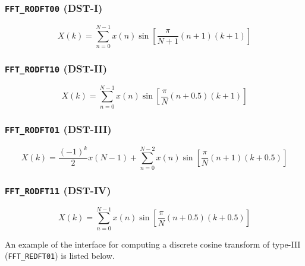 \subsubsection{{\tt FFT\_RODFT00} (DST-I)}
\label{module:fft:r2r:RODFT00}
    \begin{equation}
    \label{eqn:fft:dst-I}
        X(k) =  \sum_{n=0}^{N-1}{
                    x(n) \sin\left[
                        \frac{\pi}{N+1}(n+1)(k+1)
                    \right]
                }
    \end{equation}

\subsubsection{{\tt FFT\_RODFT10} (DST-II)}
\label{module:fft:r2r:RODFT10}
    \begin{equation}
    \label{eqn:fft:dst-II}
        X(k) =  \sum_{n=0}^{N-1}{
                    x(n) \sin\left[
                        \frac{\pi}{N}(n+0.5)(k+1)
                    \right]
                }
    \end{equation}

\subsubsection{{\tt FFT\_RODFT01} (DST-III)}
\label{module:fft:r2r:RODFT01}
    \begin{equation}
    \label{eqn:fft:dst-III}
        X(k) =  \frac{(-1)^k}{2}x(N-1) + 
                \sum_{n=0}^{N-2}{
                    x(n) \sin\left[
                        \frac{\pi}{N}(n+1)(k+0.5)
                    \right]
                }
    \end{equation}

\subsubsection{{\tt FFT\_RODFT11} (DST-IV)}
\label{module:fft:r2r:RODFT11}
    \begin{equation}
    \label{eqn:fft:dst-IV}
        X(k) =  \sum_{n=0}^{N-1}{
                    x(n) \sin\left[
                        \frac{\pi}{N}(n+0.5)(k+0.5)
                    \right]
                }
    \end{equation}

An example of the interface for computing a discrete cosine transform
of type-III ({\tt FFT\_REDFT01}) is listed below.
%


%

